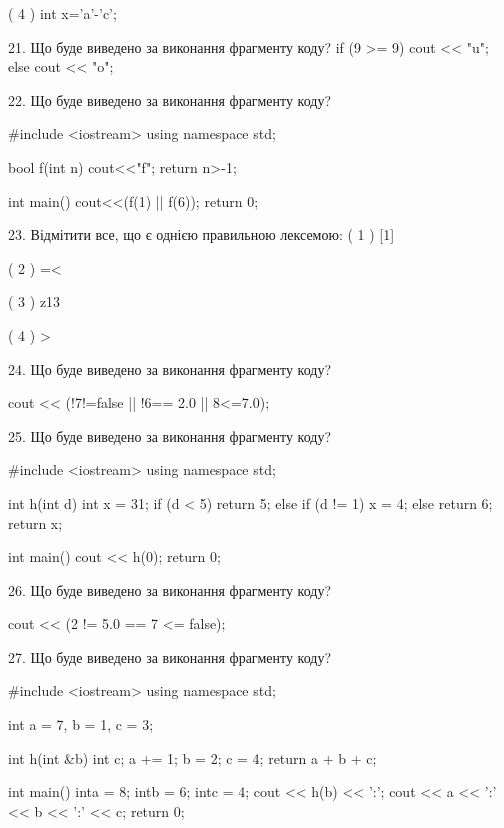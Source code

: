 \documentclass[11pt, ukrainian]{article}
\begin{document}
\begin{large}
( 4 ) int x='a'-'c';


21. Що буде виведено за виконання фрагменту коду?
if (9 >= 9)
    cout << "u";
else
    cout << "o";



22. Що буде виведено за виконання фрагменту коду?

#include <iostream>
using namespace std;

bool f(int n){
    cout<<"f";
    return n>-1;
}

int main(){
    cout<<(f(1) || f(6));
    return 0;
}


23. Відмітити все, що є однією правильною лексемою:
( 1 ) [1]

( 2 ) =<

( 3 ) z13

( 4 ) >


24. Що буде виведено за виконання фрагменту коду?

cout << (!7!=false || !6== 2.0 || 8<=7.0);


25. Що буде виведено за виконання фрагменту коду?

#include <iostream>
using namespace std;

int h(int d){
    int x = 31;
    if (d < 5) 
        return 5;
    else if (d != 1)
         x = 4;
    else
         return 6;
    return x;
}

int main(){
    cout << h(0);
    return 0;
}



26. Що буде виведено за виконання фрагменту коду?

cout << (2 != 5.0 == 7 <= false);


27. Що буде виведено за виконання фрагменту коду?

#include <iostream>
using namespace std;

int a = 7, b = 1, c = 3;

int h(int &b){
int c;    a += 1;
    b = 2;
    c = 4;
    return a + b + c;
}

int main(){
    inta = 8;
    intb = 6;
    intc = 4;
    cout << h(b) << ':';
    cout << a << ':' << b << ':' << c;
    return 0; 
}


\end{large}
\end{document}
